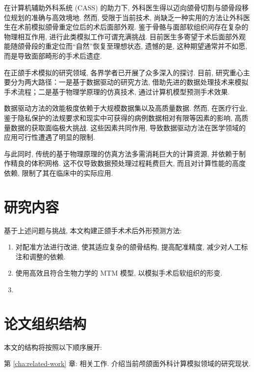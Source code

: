 在计算机辅助外科系统 (CASS) 的助力下, 外科医生得以迈向颌骨切割与颌骨段移位规划的准确与高效境地.
然而, 受限于当前技术, 尚缺乏一种实用的方法让外科医生在术前模拟颌骨重定位后的术后面部外观.
鉴于骨骼与面部软组织间存在复杂的物理相互作用, 进行此类模拟工作可谓充满挑战.
目前医生多寄望于术后面部外观能随颌骨段的重定位而“自然”恢复至理想状态, 遗憾的是, 这种期望通常并不如愿, 而是导致面部畸形的手术后遗症.

在正颌手术模拟的研究领域, 各界学者已开展了众多深入的探讨.
目前, 研究重心主要分为两大路径：一是基于数据驱动的研究方法, 借助先进的数据处理技术来模拟手术流程；二是基于物理学原理的仿真技术, 通过计算机模型预测手术效果.

数据驱动方法的效能极度依赖于大规模数据集以及高质量数据.
然而, 在医疗行业, 鉴于隐私保护的法规要求和现实中可获得的病例数据相对有限等因素的影响, 高质量数据的获取面临极大挑战.
这些因素共同作用, 导致数据驱动方法在医学领域的应用可行性遭遇了明显的限制.

与此同时, 传统的基于物理原理的仿真方法多需消耗巨大的计算资源, 并依赖于制作精良的体积网格.
这不仅导致数据预处理过程耗费巨大, 而且对计算性能的高度依赖, 限制了其在临床中的实际应用.

\section{研究内容}

基于上述问题与挑战, 本文构建正颌手术术后外形预测方法:
\begin{enumerate}
  \item 对配准方法进行改进, 使其适应复杂的颌骨结构, 提高配准精度, 减少对人工标注和调整的依赖.
  \item 使用高效且符合生物力学的 MTM 模型, 以模拟手术后软组织的形变.
  \item {}
\end{enumerate}

\section{论文组织结构}

本文的结构将按照以下顺序展开:

第 \ref{cha:related-work} 章: 相关工作. 介绍当前颅颌面外科计算模拟领域的研究现状.
